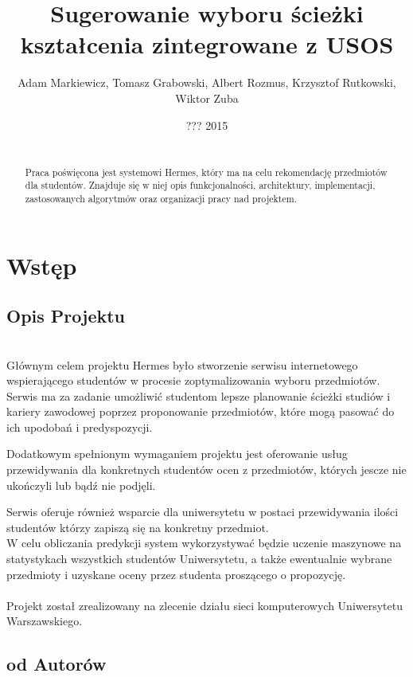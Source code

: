 \documentclass[licencjacka]{pracamgr}
\author{ Adam Markiewicz, Tomasz Grabowski, Albert Rozmus, Krzysztof Rutkowski, Wiktor Zuba}
\title{Sugerowanie wyboru ścieżki kształcenia zintegrowane z USOS}
\date{??? 2015}
\begin{document}
\maketitle
\begin{abstract} ~\\ \indent
Praca poświęcona jest systemowi Hermes, który ma na celu rekomendację przedmiotów dla studentów. Znajduje się w niej opis funkcjonalności, architektury, implementacji, zastosowanych algorytmów oraz organizacji pracy nad projektem.
\end{abstract}
\tableofcontents
\chapter{Wstęp}


 \section{Opis Projektu}


~\\ \indent Głównym celem projektu Hermes było stworzenie serwisu internetowego 
wspierającego studentów w procesie zoptymalizowania wyboru przedmiotów.
Serwis ma za zadanie 
umożliwić studentom lepsze planowanie ścieżki studiów i kariery zawodowej
poprzez proponowanie przedmiotów, które mogą pasować do ich upodobań i predyspozycji. 

Dodatkowym spełnionym wymaganiem projektu jest oferowanie usług przewidywania dla konkretnych studentów ocen z przedmiotów, których jescze nie ukończyli lub bądź nie podjęli.

Serwis oferuje również wsparcie dla uniwersytetu w postaci
przewidywania ilości studentów którzy zapiszą się na konkretny przedmiot. \\
\indent W celu obliczania predykcji system wykorzystywać będzie uczenie maszynowe na statystykach wszystkich studentów Uniwersytetu, a także ewentualnie wybrane przedmioty i uzyskane oceny przez studenta proszącego o propozycję. \\ \\
\indent Projekt został zrealizowany na zlecenie działu sieci komputerowych Uniwersytetu Warszawskiego.
\newpage
\section{od Autorów}
\end{document}
